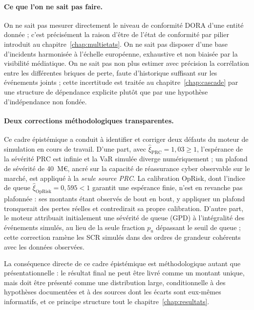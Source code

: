 \paragraph{Ce que l'on ne sait pas faire.} On ne sait pas mesurer directement
le niveau de conformité DORA d'une entité donnée ; c'est précisément la
raison d'être de l'état de conformité par pilier introduit au
chapitre~\ref{chap:multietats}. On ne sait pas
disposer d'une base d'incidents harmonisée à l'échelle européenne, exhaustive
et non biaisée par la visibilité médiatique. On ne sait pas non plus estimer
avec précision la corrélation entre les différentes briques de perte,
faute d'historique suffisant sur les événements joints ; cette incertitude
est traitée au chapitre~\ref{chap:cascade} par une structure de dépendance explicite plutôt que
par une hypothèse d'indépendance non fondée.

\paragraph{Deux corrections méthodologiques transparentes.} Ce cadre
épistémique a conduit à identifier et corriger deux défauts du moteur de
simulation en cours de travail. D'une part, avec $\hat{\xi}_{\text{PRC}} =
1{,}03 \geq 1$, l'espérance de la sévérité PRC est infinie et la VaR simulée
diverge numériquement ; un plafond de sévérité de 40~M\euro, ancré sur la
capacité de réassurance cyber observable sur le marché, est appliqué à la
\emph{seule source PRC}. La calibration OpRisk, dont l'indice de queue
$\hat{\xi}_{\text{OpRisk}} = 0{,}595 < 1$ garantit une espérance finie, n'est
en revanche pas plafonnée : ses montants étant observés de bout en bout, y
appliquer un plafond tronquerait des pertes réelles et contredirait sa propre
calibration. D'autre part, le moteur attribuait initialement une sévérité de
queue (GPD) à l'intégralité des événements simulés, au lieu de la seule
fraction $p_u$ dépassant le seuil de queue ; cette correction ramène les SCR
simulés dans des ordres de grandeur cohérents avec les données observées.

La conséquence directe de ce cadre épistémique est méthodologique autant que
présentationnelle : le résultat final ne peut être livré comme un montant
unique, mais doit être présenté comme une distribution large, conditionnelle
à des hypothèses documentées et à des sources dont les écarts sont eux-mêmes
informatifs, et ce principe structure tout le chapitre~\ref{chap:resultats}.


